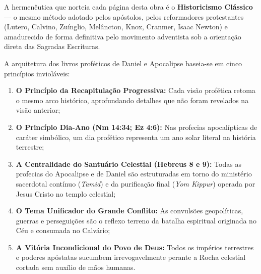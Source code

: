 \documentclass[11pt,a4paper,openany]{book}
\begin{document}
A hermenêutica que norteia cada página desta obra é o \textbf{Historicismo Clássico} --- o mesmo método adotado pelos apóstolos, pelos reformadores protestantes (Lutero, Calvino, Zuínglio, Melâncton, Knox, Cranmer, Isaac Newton) e amadurecido de forma definitiva pelo movimento adventista sob a orientação direta das Sagradas Escrituras.

A arquitetura dos livros proféticos de Daniel e Apocalipse baseia-se em cinco princípios invioláveis:
\begin{enumerate}
    \item \textbf{O Princípio da Recapitulação Progressiva:} Cada visão profética retoma o mesmo arco histórico, aprofundando detalhes que não foram revelados na visão anterior;
    \item \textbf{O Princípio Dia-Ano (Nm 14:34; Ez 4:6):} Nas profecias apocalípticas de caráter simbólico, um dia profético representa um ano solar literal na história terrestre;
    \item \textbf{A Centralidade do Santuário Celestial (Hebreus 8 e 9):} Todas as profecias do Apocalipse e de Daniel são estruturadas em torno do ministério sacerdotal contínuo (\textit{Tamid}) e da purificação final (\textit{Yom Kippur}) operada por Jesus Cristo no templo celestial;
    \item \textbf{O Tema Unificador do Grande Conflito:} As convulsões geopolíticas, guerras e perseguições são o reflexo terreno da batalha espiritual originada no Céu e consumada no Calvário;
    \item \textbf{A Vitória Incondicional do Povo de Deus:} Todos os impérios terrestres e poderes apóstatas sucumbem irrevogavelmente perante a Rocha celestial cortada sem auxílio de mãos humanas.
\end{enumerate}

\tableofcontents

\mainmatter









\backmatter
\end{document}
